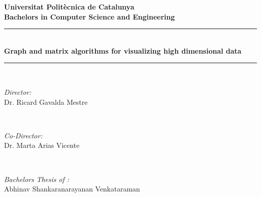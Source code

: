 \begin{titlepage}

\newcommand{\HRule}{\rule{\linewidth}{0.5mm}} %

\center %
 

\textbf{\LARGE Universitat Politècnica de Catalunya}\\[1cm] %
\textbf{\Large Bachelors in Computer Science and Engineering}\\[0.5cm] %


\HRule \\[0.4cm]
{ \huge \bfseries Graph and matrix algorithms for visualizing high dimensional data}\\[0.4cm] %
\HRule \\[1.5cm]
 

\begin{minipage}{0.4\textwidth}
\begin{flushleft} \large
\emph{Director:}\\
Dr. Ricard Gavalda Mestre 
\end{flushleft}
\end{minipage}
~
\begin{minipage}{0.4\textwidth}
\begin{flushright} \large
\emph{Co-Director:} \\
Dr. Marta Arias Vicente %
\end{flushright}
\end{minipage}\\[2cm]

\begin{minipage}{0.4\textwidth}
\begin{flushleft} \large
\emph{Bachelors Thesis of :}\\
Abhinav Shankaranarayanan Venkataraman
\end{flushleft}
\end{minipage}


\end{titlepage}
